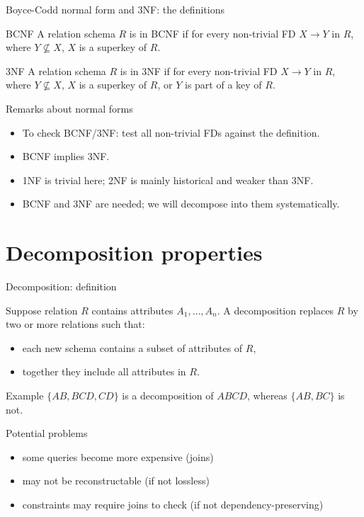 \documentclass[10pt,aspectratio=169]{beamer}
\newenvironment{examplebox}[1][Example]{\begin{exampleblock}{#1}}{\end{exampleblock}}
\begin{document}
\begin{frame}{Boyce-Codd normal form and 3NF: the definitions}
\begin{block}{BCNF}
A relation schema \(R\) is in BCNF if for every non-trivial FD \(X \rightarrow Y\) in \(R\), where \(Y \nsubseteq X\),
\(X\) is a superkey of \(R\).
\end{block}

\begin{block}{3NF}
A relation schema \(R\) is in 3NF if for every non-trivial FD \(X \rightarrow Y\) in \(R\), where \(Y \nsubseteq X\),
\(X\) is a superkey of \(R\), or \(Y\) is part of a key of \(R\).
\end{block}

\begin{alertblock}{Remarks about normal forms}
\begin{itemize}
  \item To check BCNF/3NF: test all non-trivial FDs against the definition.
  \item BCNF implies 3NF.
  \item 1NF is trivial here; 2NF is mainly historical and weaker than 3NF.
  \item BCNF and 3NF are needed; we will decompose into them systematically.
\end{itemize}
\end{alertblock}
\end{frame}

\section{Decomposition properties}

\begin{frame}{Decomposition: definition}
\begin{definition}[Decomposition]
Suppose relation \(R\) contains attributes \(A_1,\dots,A_n\). A decomposition replaces \(R\) by two or more relations such that:
\begin{itemize}
  \item each new schema contains a subset of attributes of \(R\),
  \item together they include all attributes in \(R\).
\end{itemize}
\end{definition}

\begin{examplebox}[Example]
\(\{AB,BCD,CD\}\) is a decomposition of \(ABCD\), whereas \(\{AB,BC\}\) is not.
\end{examplebox}

\begin{alertblock}{Potential problems}
\begin{itemize}
  \item some queries become more expensive (joins)
  \item may not be reconstructable (if not lossless)
  \item constraints may require joins to check (if not dependency-preserving)
\end{itemize}
\end{alertblock}
\end{frame}
\end{document}
